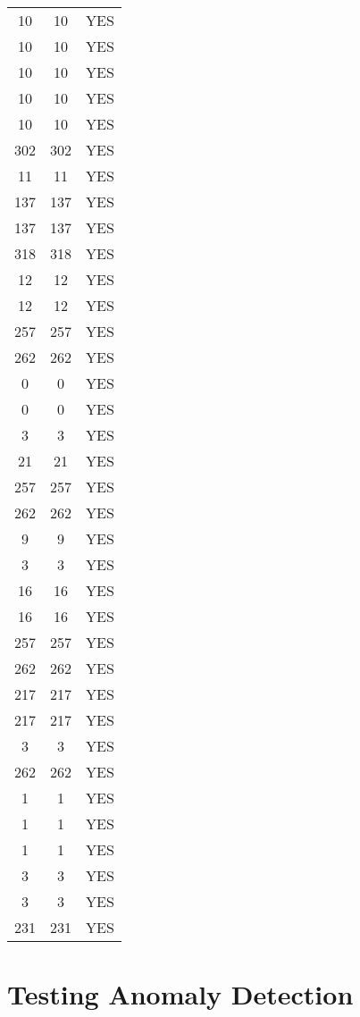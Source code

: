 \documentclass{report}
\begin{document}
\begin{spacing}{1.5}
\begin{longtable}{|c|c|c|}
 10 &  10 & YES \\
 10 &  10 & YES \\
 10 &  10 & YES \\
 10 &  10 & YES \\
 10 &  10 & YES \\
302 & 302 & YES \\
 11 &  11 & YES \\
137 & 137 & YES \\
137 & 137 & YES \\
318 & 318 & YES \\
 12 &  12 & YES \\
 12 &  12 & YES \\
257 & 257 & YES \\
262 & 262 & YES \\
  0 &   0 & YES \\
  0 &   0 & YES \\
  3 &   3 & YES \\
 21 &  21 & YES \\
257 & 257 & YES \\
262 & 262 & YES \\
  9 &   9 & YES \\
  3 &   3 & YES \\
 16 &  16 & YES \\
 16 &  16 & YES \\
257 & 257 & YES \\
262 & 262 & YES \\
217 & 217 & YES \\
217 & 217 & YES \\
  3 &   3 & YES \\
262 & 262 & YES \\
  1 &   1 & YES \\
  1 &   1 & YES \\
  1 &   1 & YES \\
  3 &   3 & YES \\
  3 &   3 & YES \\
231 & 231 & YES \\



\end{longtable}


\section{Testing Anomaly Detection}



\end{spacing}
\end{document}
